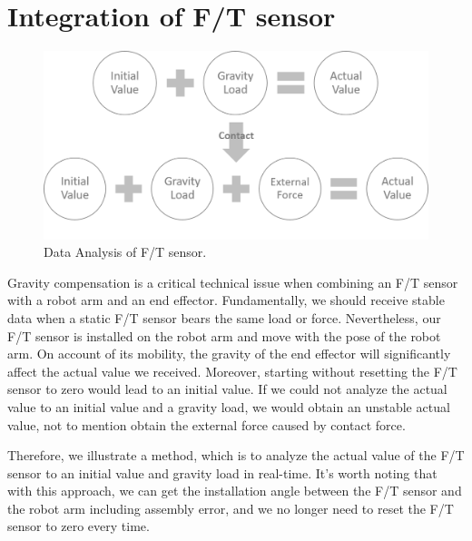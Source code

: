 \section{Integration of F/T sensor}
\label{sec:grav compen}
\begin{figure}[htbp]
\begin{center}
\includegraphics[width=1\linewidth]{Images/gravity compensation.png}
\end{center}
\caption{
Data Analysis of F/T sensor.
}\label{fig:gravity compensation}
\end{figure}
Gravity compensation is a critical technical issue when combining an F/T sensor with a robot arm and an end effector. Fundamentally, we should receive stable data when a static F/T sensor bears the same load or force. Nevertheless, our F/T sensor is installed on the robot arm and move with the pose of the robot arm. On account of its mobility, the gravity of the end effector will significantly affect the actual value we received. Moreover, starting without resetting the F/T sensor to zero would lead to an initial value. If we could not analyze the actual value to an initial value and a gravity load, we would obtain an unstable actual value, not to mention obtain the external force caused by contact force.
\par
Therefore, we illustrate a method, which is to analyze the actual value of the F/T sensor to an initial value and gravity load in real-time. It's worth noting that with this approach, we can get the installation angle between the F/T sensor and the robot arm including assembly error, and we no longer need to reset the F/T sensor to zero every time.

